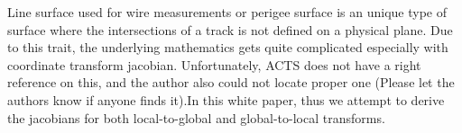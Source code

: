 
Line surface used for wire measurements or perigee surface is an unique type of surface where the intersections of a track is not defined on a physical plane. Due to this trait, the underlying mathematics gets quite complicated especially with coordinate transform jacobian. Unfortunately, ACTS does not have a right reference on this, and the author also could not locate proper one (Please let the authors know if anyone finds it).In this white paper, thus we attempt to derive the jacobians for both local-to-global and global-to-local transforms.